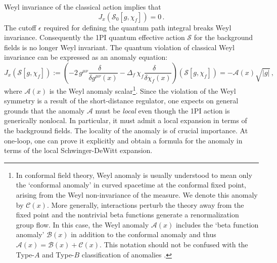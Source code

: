 \documentclass[12pt,a4paper]{article}
\newcommand{\be}{\begin{equation}}
\newcommand{\ee}{\end{equation}}
\newcommand{\cB}{\mathcal{B}}
\newcommand{\cC}{\mathcal{C}}
\newcommand{\cS}{\mathcal{S}}
\renewcommand{\d}{\delta}
\newcommand{\e}{\epsilon}
\newcommand{\m}{\mu}
\newcommand{\n}{\nu}
\newcommand{\1}{{\textbf{1}}}
\newcommand{\+}{{\,+ \,}}
\begin{document}
Weyl invariance of the classical action implies that
\be
J_{x }\left( \cS_{0}[g, \chi_{f}]\right) = 0 \, .
\ee
The cutoff $\e$ required for defining the quantum path integral breaks Weyl invariance.  Consequently the 1PI quantum effective action $\cS$ for the background fields is no longer Weyl invariant. The quantum violation of classical Weyl invariance can be expressed as an anomaly equation:
\be\label{anomaly}
J_{x } \left( \cS[g, \chi_{f}]\right) := \left(-2 \,g^{\mu\nu}\frac{\delta\quad}{\d g^{\m\n}(x)} - \Delta_{f }\, \chi_{f} \frac{\d \quad}{\d \chi_{f}(x)}\right) \left(\cS [ g, \chi_{f}] \right)= - \mathcal{A}(x) \sqrt{|g|} \, ,
\ee
where $\mathcal{A}(x)$ is the Weyl anomaly scalar\footnote{In conformal field theory, Weyl anomaly is usually understood to mean only  the `conformal anomaly’ in  curved spacetime at the conformal fixed point, arising from the Weyl non-invariance of the measure. We denote this anomaly by $\mathcal{C}(x)$. More generally, interactions  perturb the theory away from the fixed point and the nontrivial beta functions  generate a renormalization group flow. In this case, the Weyl anomaly $\mathcal{A}(x)$  includes  the `beta function anomaly' $\cB(x)$  in addition to  the conformal anomaly and thus $\mathcal{A}(x) = \cB(x) + \cC(x)$. This notation should not be confused with the Type-$A$  and  Type-$B$ classification  of anomalies \cite{Deser:1993yx}.}. Since the violation of the Weyl symmetry is a result of the short-distance regulator, one expects on general grounds that the anomaly $\mathcal{A}$ must be \textit{local} even though the 1PI action is generically nonlocal. In particular, it must admit a local expansion in terms of the background fields. 
The locality of the anomaly is of crucial importance. At one-loop, one can prove it explicitly and obtain a formula for the anomaly in terms of the local Schwinger-DeWitt expansion.  
\end{document}
